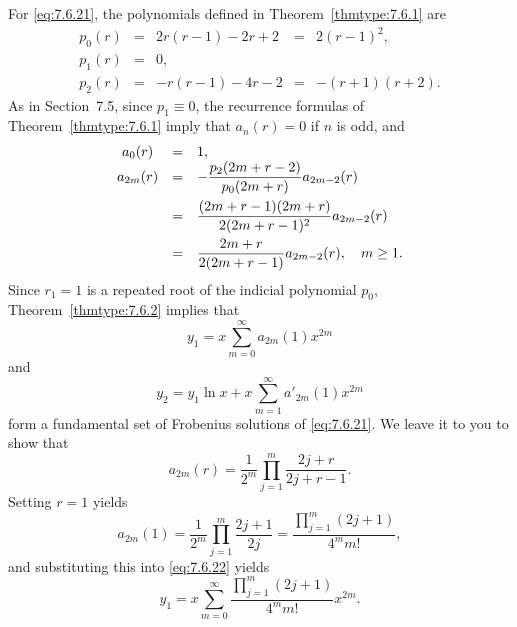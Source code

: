 \begin{examplesolution}
\solution For \eqref{eq:7.6.21}, the polynomials defined in Theorem~\ref{thmtype:7.6.1} are
\[
  \begin{array}{ccccc}
    p_{0}(r) & = & 2r(r-1)-2r+2 & = & 2(r-1)^{2},  \\[5pt]
    p_{1}(r) & = & 0,            \\[5pt]
    p_{2}(r) & = & -r(r-1)-4r-2 & = & -(r+1)(r+2).
  \end{array}
\]
As in Section~7.5, since $p_{1}\equiv0$, the recurrence formulas of Theorem~\ref{thmtype:7.6.1}
imply that $a_{n}(r)=0$ if $n$ is odd, and
\[
  \begin{array}{ccl}
    a_{0}(r)  & = & 1,                                                  \\
    a_{2m}(r) & = & -\displaystyle\frac{p_{2}(2m+r-2)}{p_{0}(2m+r)}a_{2m-2}(r)   \\[10pt]
              & = & \displaystyle\frac{(2m+r-1)(2m+r)}{2(2m+r-1)^{2}}a_{2m-2}(r) \\[10pt]
              & = & \displaystyle\frac{2m+r}{2(2m+r-1)}a_{2m-2}(r),\quad m\ge1.
  \end{array}
\]
Since $r_{1}=1$ is a repeated root of the indicial polynomial $p_{0}$, Theorem~\ref{thmtype:7.6.2}
implies that
\begin{equation}
  \label{eq:7.6.22}y_{1}=x\sum_{m=0}^{\infty}a_{2m}(1)x^{2m}
\end{equation}
and
\begin{equation}
  \label{eq:7.6.23}y_{2}=y_{1}\ln x+x\sum_{m=1}^{\infty}a'_{2m}(1)x^{2m}
\end{equation}
form a fundamental set of Frobenius solutions of \eqref{eq:7.6.21}. We leave it to you to show that
\begin{equation}
  \label{eq:7.6.24}a_{2m}(r)=\frac{1}{2^{m}}\prod_{j=1}^{m}\frac{2j+r}{2j+r-1}.
\end{equation}
Setting $r=1$ yields
\begin{equation}
  \label{eq:7.6.25}a_{2m}(1)=\frac{1}{2^{m}}\prod_{j=1}^{m}\frac{2j+1}{2j}=\frac{\prod_{j=1}^{m}(2j+1)}{4^{m}m!},
\end{equation}
and substituting this into \eqref{eq:7.6.22} yields
\[
  y_{1}=x\sum_{m=0}^{\infty}\frac{\prod_{j=1}^{m}(2j+1)}{4^{m}m!}x^{2m}.
\]


\end{examplesolution}
